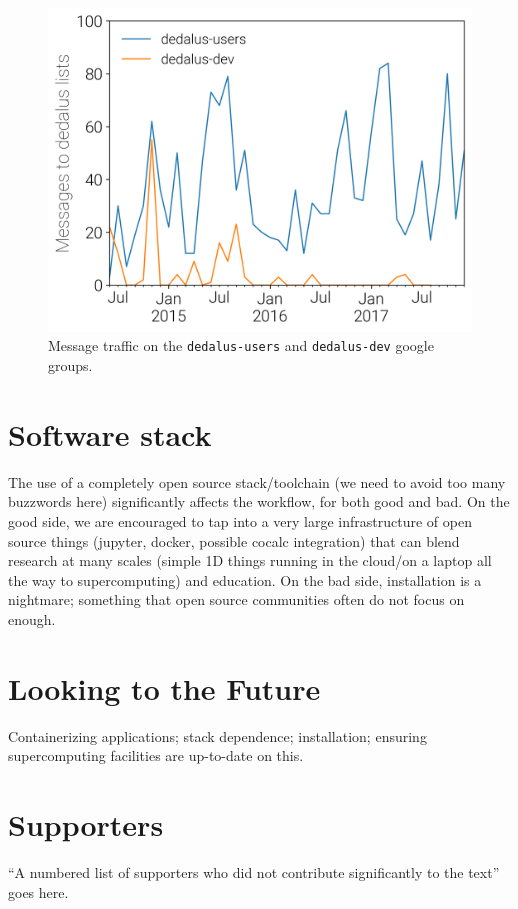 \documentclass[12pt, preprint]{aastex}
\begin{document}
\begin{figure}
  \centering
  \includegraphics{../figs/message_counts.png}
  \caption{Message traffic on the \texttt{dedalus-users} and \texttt{dedalus-dev} google groups.}
  \label{fig:messages}
\end{figure}

\section{Software stack}
\label{sec:stack}

The use of a completely open source stack/toolchain (we need to avoid too many buzzwords here) significantly affects the workflow, for both good and bad. On the good side, we are encouraged to tap into a very large infrastructure of open source things (jupyter, docker, possible cocalc integration) that can blend research at many scales (simple 1D things running in the cloud/on a laptop all the way to supercomputing) and education. On the bad side, installation is a nightmare; something that open source communities often do not focus on enough.

\section{Looking to the Future}
\label{sec:future}

Containerizing applications; stack dependence; installation; ensuring supercomputing facilities are up-to-date on this.
\appendix

\section{Supporters}
\label{sec:supporters}

``A numbered list of supporters who did not contribute significantly to the text'' goes here.



\end{document}
